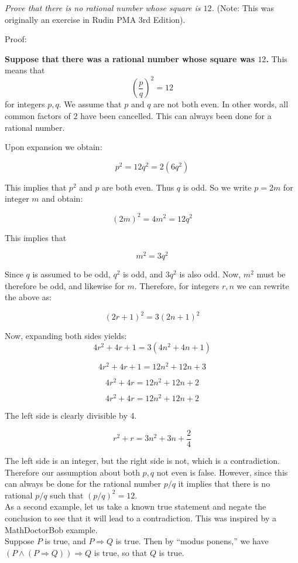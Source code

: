 \textit{Prove that there is no rational number whose square is $12$.}  (Note:  This was originally an exercise in Rudin PMA 3rd Edition).

Proof:

\textbf{Suppose that there was a rational number whose square was $12$.}  This means that
$$ \left(\frac{p}{q}\right)^{2}=12$$ for integers $p,q.$  We assume that $p$ and $q$ are not both even.  In other words, all common factors of $2$ have been cancelled.  This can always been done for a rational number.

Upon expansion we obtain:

$$p^{2}=12q^{2}=2\left(6q^{2}\right)$$

This implies that $p^{2}$ and $p$ are both even.  Thus $q$ is odd.  So we write $p=2m$ for integer $m$ and obtain:

$$\left(2m\right)^{2}=4m^{2}=12q^{2}$$

This implies that 

$$m^{2}=3q^{2}$$

Since $q$ is assumed to be odd, $q^{2}$ is odd, and $3q^{2}$ is also odd.  Now, $m^{2}$ must be therefore be odd, and likewise for $m$.  Therefore, for integers $r,n$ we can rewrite the above as:

$$
\left(2r+1\right)^{2}=3\left(2n+1\right)^{2}
$$

Now, expanding both sides yields:
$$
4r^{2}+4r+1=3\left(4n^{2}+4n+1\right)
$$

$$
4r^{2}+4r+1=12n^{2}+12n+3
$$

$$
4r^{2}+4r=12n^{2}+12n+2
$$

$$
4r^{2}+4r=12n^{2}+12n+2
$$

The left side is clearly divisible by 4.

$$
r^{2}+r=3n^{2}+3n+\frac{2}{4}
$$

The left side is an integer, but the right side is not, which is a contradiction. Therefore our assumption about both $p,q$ not even is false.  However, since this can always be done for the rational number $p/q$ it implies that there is no rational $p/q$ such that $\left(p/q\right)^{2}=12.$\\

As a second example, let us take a known true statement and negate the conclusion to see that it will lead to a contradiction.  This was inspired by a MathDoctorBob example.\\

Suppose $P$ is true, and $P \Longrightarrow Q$ is true.  Then by ``modus ponens,'' we have $\left(P \land \left(P \Longrightarrow Q \right) \right) \Longrightarrow Q$ is true, so that $Q$ is true.

